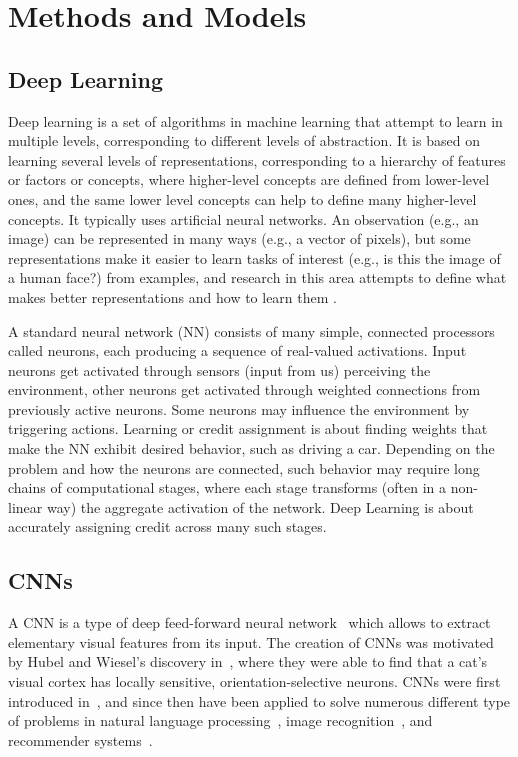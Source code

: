 \section{Methods and Models}

\subsection{Deep Learning}
Deep learning is a set of algorithms in machine learning that attempt to learn in multiple levels, corresponding to different levels of abstraction. It is based on learning several levels of representations, corresponding to a hierarchy of features or factors or concepts, where higher-level concepts are defined from lower-level ones, and the same lower level concepts can help to define many higher-level concepts. It typically uses artificial neural networks. An observation (e.g., an image) can be represented in many ways (e.g., a vector of pixels), but some representations make it easier to learn tasks of interest (e.g., is this the image of a human face?) from examples, and research in this area attempts to define what makes better representations and how to learn them \cite{DeepLearning}.

A standard neural network (NN) consists of many simple, connected processors called neurons, each producing a sequence of real-valued activations. Input neurons get activated through sensors (input from us) perceiving the environment, other neurons get activated through weighted connections from previously active neurons. Some neurons may influence the environment by triggering actions.\cite{NeuralNetwork} Learning or credit assignment is about finding weights that make the NN exhibit desired behavior, such as driving a car. Depending on the problem and how the neurons are connected, such behavior may require long chains of computational stages, where each stage transforms (often in a non-linear way) the aggregate activation of the network. Deep Learning is about accurately assigning credit across many such stages.

\subsection{CNNs}

A CNN is a type of deep feed-forward neural network~\cite{cnn-star-galaxy} which allows to extract elementary visual features from its input. The creation of CNNs was motivated by Hubel and Wiesel's discovery in~\cite{hubel-wiesel-receptive-fields}, where they were able to find that a cat's visual cortex has locally sensitive, orientation-selective neurons. CNNs were first introduced in~\cite{Lecun99objectrecognition}, and since then have been applied to solve numerous different type of problems in  natural language processing~\cite{Collobert:2008:UAN:1390156.1390177}, image recognition~\cite{cnn-star-galaxy}, and recommender systems~\cite{NIPS2013_5004}.

